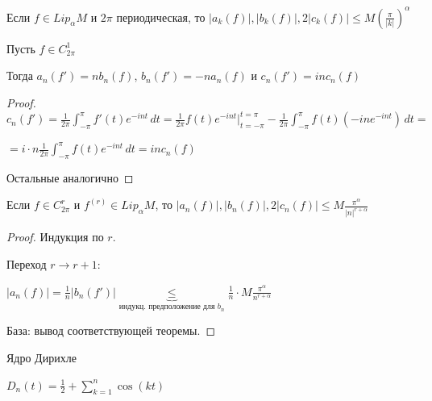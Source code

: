 \begin{consequence}
    Если $f \in Lip_\alpha M$ и $2\pi$ периодическая, то
    $|a_k (f)|, |b_k(f) |, 2| c_k(f) | \leqslant M \left (\frac{\pi}{|k|} \right )^\alpha$
\end{consequence}

\begin{lemma}
    Пусть $f \in C_{2\pi}^1$

    Тогда $a_n (f') = n b_n (f)$, $b_n (f') = -n a_n (f)$ и $c_n (f') = in c_n (f)$
\end{lemma}

\begin{proof}
    $c_n (f') = \frac{1}{2\pi} \int_{-\pi}^\pi f'(t) e^{-int} \, dt = \frac{1}{2\pi} f(t) e^{-int} \bigg |_{t = -\pi}^{t = \pi} - \frac{1}{2\pi} \int_{-\pi}^\pi f (t) (-ine^{-int}) \, dt = $
    
    $=i \cdot n \frac{1}{2\pi} \int_{-\pi}^\pi f(t) e^{-int} \, dt = in c_n (f)$

    Остальные аналогично
\end{proof}

\begin{consequence}
    Если $f \in C_{2\pi}^r$ и $f^{(r)} \in Lip_{\alpha} M$, то $|a_n(f)|, |b_n (f)|, 2|c_n (f)| \leqslant M \frac{\pi^\alpha}{|n|^{r + \alpha}}$
\end{consequence}

\begin{proof}
    Индукция по $r$.

    Переход $r \to r + 1$:

    $| a_n(f) | = \frac{1}{n} |b_n(f')| \underbrace{\leq}_{\text{индукц. предположение для } b_n} \frac{1}{n} \cdot M \frac{\pi^{\alpha}}{n^{r + \alpha}}$

    База: вывод соответствующей теоремы.
\end{proof}

\begin{definition}
    Ядро Дирихле

    $D_n (t) = \frac{1}{2} + \sum_{k = 1}^n \cos (kt)$
\end{definition}

